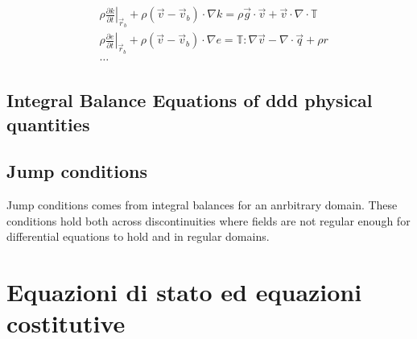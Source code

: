 \documentclass[letterpaper,10pt,english]{jupyterBook}
\begin{document}
\sphinxAtStartPar
{}
\begin{equation*}
\begin{split}\begin{aligned}
 & \rho \left.\frac{\partial k}{\partial t}\right|_{\vec{r}_b} + \rho \left( \vec{v} - \vec{v}_b \right) \cdot \nabla k = \rho \vec{g} \cdot \vec{v} + \vec{v} \cdot \nabla \cdot \mathbb{T} \\
 & \rho \left.\frac{\partial e}{\partial t}\right|_{\vec{r}_b} + \rho \left( \vec{v} - \vec{v}_b \right) \cdot \nabla e = \mathbb{T} : \nabla \vec{v} - \nabla \cdot \vec{q} + \rho r \\
 & \dots
\end{aligned}\end{split}
\end{equation*}


\sphinxstepscope


\section{Integral Balance Equations of ddd physical quantities}
\label{\detokenize{ch/continuum/balance-derived-integral:integral-balance-equations-of-ddd-physical-quantities}}\label{\detokenize{ch/continuum/balance-derived-integral:continuum-governing-equations-primary-integral}}\label{\detokenize{ch/continuum/balance-derived-integral::doc}}


\sphinxstepscope


\section{Jump conditions}
\label{\detokenize{ch/continuum/balance-jump:jump-conditions}}\label{\detokenize{ch/continuum/balance-jump:continuum-governing-equations-jump-conditions}}\label{\detokenize{ch/continuum/balance-jump::doc}}
\sphinxAtStartPar
Jump conditions comes from integral balances for an anrbitrary domain. These conditions hold both across discontinuities \sphinxhyphen{} where fields are not regular enough for differential equations to hold \sphinxhyphen{} and in regular domains.

\sphinxstepscope


\chapter{Equazioni di stato ed equazioni costitutive}
\label{\detokenize{ch/continuum/constitutive-equations:equazioni-di-stato-ed-equazioni-costitutive}}\label{\detokenize{ch/continuum/constitutive-equations:continuum-constitutive-equations}}\label{\detokenize{ch/continuum/constitutive-equations::doc}}
\sphinxstepscope
\end{document}
